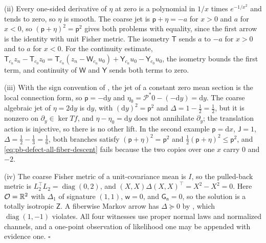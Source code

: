 (ii) Every one-sided derivative of \(\eta\) at zero is a polynomial in \(1/x\) times \(e^{-1/x^2}\) and
tends to zero, so \(\eta\) is smooth. The coarse jet is \(\mathsf p+\eta=-a\) for \(x>0\) and \(a\) for
\(x<0\), so \((\mathsf p+\eta)^2=\mathsf p^2\) gives both problems with equality, since the first arrow is
the identity with unit Fisher metric. The isometry \(\mathsf T\) sends \(a\) to \(-a\) for \(x>0\) and to
\(a\) for \(x<0\). For the continuity estimate,
\(\mathsf T_{c_n}z_n-\mathsf T_{c_0}z_0=\mathsf T_{c_n}(z_n-\mathsf W_{c_n}u_0)+\mathsf Y_{c_n}u_0-\mathsf Y_{c_0}u_0\),
the isometry bounds the first term, and continuity of \(\mathsf W\) and \(\mathsf Y\) sends both terms to
zero.

(iii) With the sign convention of , the jet of a constant zero mean
section is the local connection form, so \(\mathsf p=-\mathrm dy\) and
\(\eta_0=\mathcal P^*0-(-\mathrm dy)=\mathrm dy\). The coarse algebraic jet of \(\eta=2\mathrm dy\) is
\(\mathrm dy\), with \((\mathrm dy)^2=\mathsf p^2\) and \(\Delta=1-\tfrac12=\tfrac12\), but it is nonzero on
\(\partial_y\in\ker Tf\), and \(\eta-\eta_0=\mathrm dy\) does not annihilate \(\partial_y\); the
translation action is injective, so there is no other lift. In the second example
\(\mathsf p=\mathrm dx\), \(\mathsf J=1\), \(\Delta=\tfrac12-\tfrac13=\tfrac16\), both branches satisfy
\((\mathsf p+\eta)^2=\mathsf p^2\) and \(\tfrac12(\mathsf p+\eta)^2\leq\mathsf p^2\), and
\eqref{eq:pb-defect-all-fiber-descent} fails because the two copies over one \(x\) carry \(0\) and \(-2\).

(iv) The coarse Fisher metric of a unit-covariance mean is \(I\), so the pulled-back metric is
\(L_2^\top L_2=\operatorname{diag}(0,2)\), and \((X,X)\Delta(X,X)^\top=X^2-X^2=0\). Here
\(\mathcal O=\mathbb R^2\) with \(\Delta_1\) of signature \((1,1)\), \(\mathsf w=0\), and
\(\mathsf G_{\mathsf n}=0\), so the solution is a totally isotropic \(\mathsf Z\). A fiberwise Markov
arrow has \(\Delta\succeq0\) by , which \(\operatorname{diag}(1,-1)\)
violates. All four witnesses use proper normal laws and normalized channels, and a one-point observation
of likelihood one may be appended with evidence one. \hfill$\square$
